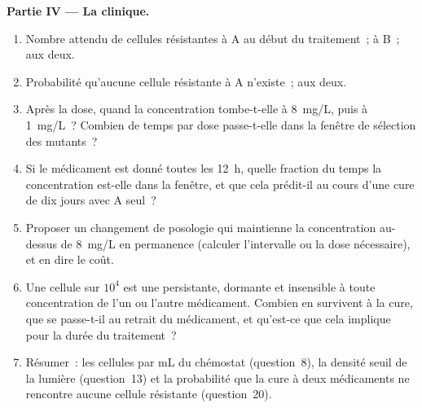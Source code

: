 \begin{problem}
\medskip
\noindent\textbf{Partie IV --- La clinique.}
\begin{enumerate}[resume]
  \item Nombre attendu de cellules résistantes à A au début du
        traitement~; à B~; aux deux.
  \item Probabilité qu'aucune cellule résistante à A n'existe~; aux
        deux.
  \item Après la dose, quand la concentration tombe-t-elle à
        \qty{8}{mg/L}, puis à \qty{1}{mg/L}~? Combien de temps par dose
        passe-t-elle dans la fenêtre de sélection des mutants~?
  \item Si le médicament est donné toutes les \qty{12}{h}, quelle
        fraction du temps la concentration est-elle dans la fenêtre, et
        que cela prédit-il au cours d'une cure de dix jours avec A
        seul~?
  \item Proposer un changement de posologie qui maintienne la
        concentration au-dessus de \qty{8}{mg/L} en permanence
        (calculer l'intervalle ou la dose nécessaire), et en dire le
        coût.
  \item Une cellule sur $10^{4}$ est une persistante, dormante et
        insensible à toute concentration de l'un ou l'autre médicament.
        Combien en survivent à la cure, que se passe-t-il au retrait du
        médicament, et qu'est-ce que cela implique pour la durée du
        traitement~?
  \item Résumer~: les cellules par mL du chémostat (question~8), la
        densité seuil de la lumière (question~13) et la probabilité que
        la cure à deux médicaments ne rencontre aucune cellule
        résistante (question~20).
\end{enumerate}
\end{problem}
